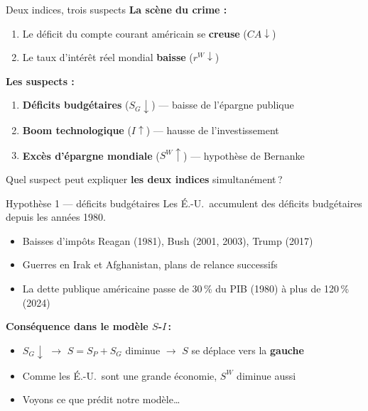\documentclass[aspectratio=169]{beamer}
\begin{document}
\begin{frame}[t]{Deux indices, trois suspects}
   \small
   \textbf{La scène du crime :}
   \vspace{0.15cm}
   \begin{enumerate}
      \setlength\itemsep{0.15cm}
      \item Le déficit du compte courant américain se \textbf{creuse} ($CA \downarrow$)
      \item Le taux d'intérêt réel mondial \textbf{baisse} ($r^W \downarrow$)
   \end{enumerate}
   \vspace{0.2cm}
   \textbf{Les suspects :}
   \vspace{0.15cm}
   \begin{enumerate}
      \setlength\itemsep{0.15cm}
      \item \textbf{Déficits budgétaires} ($S_G \downarrow$) --- baisse de l'épargne publique
      \item \textbf{Boom technologique} ($I \uparrow$) --- hausse de l'investissement
      \item \textbf{Excès d'épargne mondiale} ($S^W \uparrow$) --- hypothèse de Bernanke
   \end{enumerate}
   \vspace{0.2cm}
   \begin{warning}[La question]
      Quel suspect peut expliquer \textbf{les deux indices} simultanément\,?
   \end{warning}
\end{frame}


\begin{frame}[t]{Hypothèse 1 --- déficits budgétaires}
   \small
   \vspace{0.1cm}
   Les É.-U.\ accumulent des déficits budgétaires depuis les années 1980.
   \vspace{0.2cm}
   \begin{itemize}
      \setlength\itemsep{0.2cm}
      \item Baisses d'impôts Reagan (1981), Bush (2001, 2003), Trump (2017)
      \item Guerres en Irak et Afghanistan, plans de relance successifs
      \item La dette publique américaine passe de 30\,\% du PIB (1980) à plus de 120\,\% (2024)
   \end{itemize}
   \vspace{0.15cm}
   \textbf{Conséquence dans le modèle $S$-$I$\,:}
   \vspace{0.1cm}
   \begin{itemize}
      \setlength\itemsep{0.1cm}
      \item $S_G \downarrow$ $\to$ $S = S_P + S_G$ diminue $\to$ $S$ se déplace vers la \textbf{gauche}
      \item Comme les É.-U.\ sont une grande économie, $S^W$ diminue aussi
      \item Voyons ce que prédit notre modèle\ldots
   \end{itemize}
\end{frame}
\end{document}
